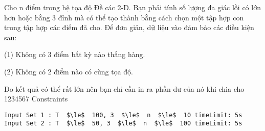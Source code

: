 Cho n điểm trong hệ tọa độ Đề các 2-D. Bạn phải tính số lượng đa giác lồi có lớn hơn hoặc bằng 3 đỉnh mà có thể tạo thành bằng cách chọn một tập hợp con trong tập hợp các điểm đã cho. Để đơn giản, dữ liệu vào đảm bảo các điều kiện sau:  
\begin{itemize}

    (1) Không có 3 điểm bất kỳ nào thẳng hàng.   

    (2) Không có 2 điểm nào có cùng tọa độ.   
\end{itemize}

   Do kết quả có thể rất lớn nên bạn chỉ cần in ra phần dư của nó khi chia cho 1234567
   Constraints  
\begin{verbatim}
Input Set 1 : T  $\le$  100, 3  $\le$  n  $\le$  10 timeLimit: 5s  
Input Set 2 : T  $\le$  50, 3  $\le$  n  $\le$  100 timeLimit: 5s 
\end{verbatim}